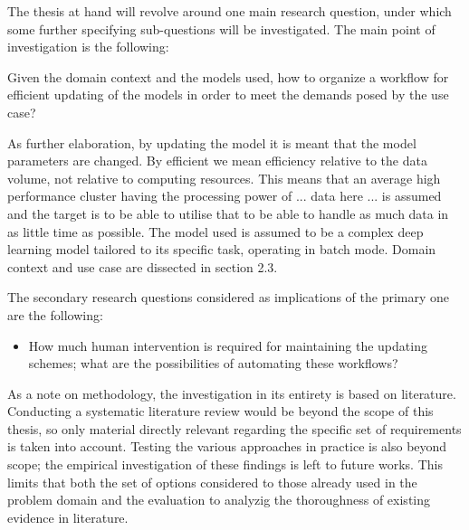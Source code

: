 


The thesis at hand will revolve around one main research question, under which some further specifying sub-questions will be investigated. The main point of investigation is the following:

\begin{center}
    Given the domain context and the models used, how to organize a workflow for efficient updating of the models in order to meet the demands posed by the use case?
\end{center}

As further elaboration, by updating the model it is meant that the model parameters are changed. By efficient we mean efficiency relative to the data volume, not relative to computing resources. This means that an average high performance cluster having the processing power of ... data here ... is assumed and the target is to be able to utilise that to be able to handle as much data in as little time as possible. The model used is assumed to be a complex deep learning model tailored to its specific task, operating in batch mode. Domain context and use case are dissected in section 2.3.

The secondary research questions considered as implications of the primary one are the following:

\begin{itemize}
    \item How much human intervention is required for maintaining the updating schemes; what are the possibilities of automating these workflows?
\end{itemize}


As a note on methodology, the investigation in its entirety is based on literature. Conducting a systematic literature review would be beyond the scope of this thesis, so only material directly relevant regarding the specific set of requirements is taken into account. Testing the various approaches in practice is also beyond scope; the empirical investigation of these findings is left to future works. This limits that both the set of options considered to those already used in the problem domain and the evaluation to analyzig the thoroughness of existing evidence in literature.

